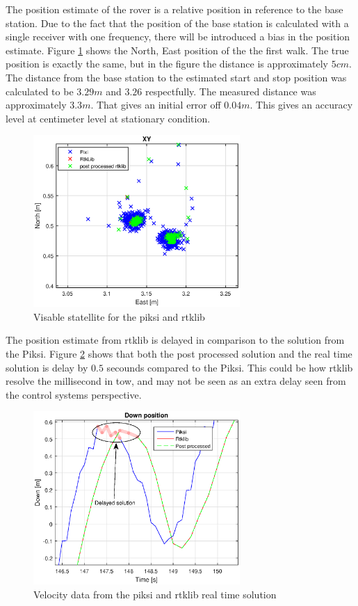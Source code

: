 The position estimate of the rover is a relative position in reference to the base station. Due to the fact that the position of the base station is calculated with a single receiver with one frequency, there will be introduced a bias in the position estimate. Figure \ref{figure:enhancedxywalk1} shows the North, East position of the the first walk. The true position is exactly the same, but in the figure the distance is approximately $5cm$. The distance from the base station to the estimated start and stop position was calculated to be $3.29m$ and $3.26$ respectfully. The measured distance was approximately $3.3m$. That gives an initial error off $0.04m$. This gives an accuracy level at centimeter level at stationary condition. 
\begin{figure}[H]
	\centering
		\includegraphics[width=0.7\textwidth]{figs/plots/enhancedxywalk1.eps}
		\caption{Visable statellite for the piksi and rtklib}
		\label{figure:enhancedxywalk1}
\end{figure}
The position estimate from \gls{rtklib} is delayed in comparison to the solution from the Piksi. Figure \ref{figure:DownDelay} shows that both the post processed solution and the real time solution is delay by $0.5$ secounds compared to the Piksi. This could be how \gls{rtklib} resolve the millisecond in \acrfull{tow}, and may not be seen as an extra delay seen from the control systems perspective.
\begin{figure}[H]
	\centering
		\includegraphics[width=0.7\textwidth]{figs/plots/downDelay.eps}
		\caption{Velocity data from the piksi and rtklib real time solution}
		\label{figure:DownDelay}
\end{figure}
